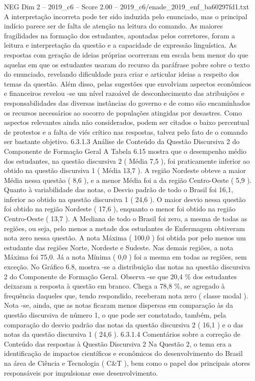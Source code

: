 \begin{textsample}{NEG Dim 2 – 2019\_c6 – Score 2.00 – 2019\_c6/enade\_2019\_enf\_ba60297fd1.txt}
A interpretação incorreta pode ter sido induzida pelo enunciado, mas o principal indício parece ser de falta de atenção na leitura do comando.
As maiores fragilidades na formação dos estudantes, apontadas pelos corretores, foram a leitura e interpretação da questão e a capacidade de expressão linguística.
As respostas com geração de ideias próprias ocorreram em escala bem menor do que aquelas em que os estudantes usaram do recurso da paráfrase pobre sobre o texto do enunciado, revelando dificuldade para criar e articular ideias a respeito dos temas da questão.
Além disso, pelas sugestões que envolviam aspectos econômicos e financeiros revelou -se um nível razoável de desconhecimento das atribuições e responsabilidades das diversas instâncias do governo e de como são encaminhados os recursos necessários ao socorro de populações atingidas por desastres.
Como aspectos relevantes ainda não considerados, podem ser citados o baixo percentual de protestos e a falta de viés crítico nas respostas, talvez pelo fato de o comando ser bastante objetivo. 6.3.1.3 Análise de Conteúdo da Questão Discursiva 2 do Componente de Formação Geral A Tabela 6.15 mostra que o desempenho médio dos estudantes, na questão discursiva 2 ( Média 7,5 ), foi praticamente inferior ao obtido na questão discursiva 1 ( Média 13,7 ).
A região Nordeste obteve a maior Média nessa questão ( 8,6 ), e a menor Média foi a da região Centro-Oeste ( 5,9 ).
Quanto à variabilidade das notas, o Desvio padrão de todo o Brasil foi 16,1, inferior ao obtido na questão discursiva 1 ( 24,6 ).
O maior desvio nessa questão foi obtido na região Nordeste ( 17,6 ), enquanto o menor foi obtido na região Centro-Oeste ( 13,7 ).
A Mediana de todo o Brasil foi zero, a mesma de todas as regiões, ou seja, pelo menos a metade dos estudantes de Enfermagem obtiveram nota zero nessa questão.
A nota Máxima ( 100,0 ) foi obtida por pelo menos um estudante das regiões Norte, Nordeste e Sudeste.
Nas demais regiões, a nota Máxima foi 75,0.
Já a nota Mínima ( 0,0 ) foi a mesma em todas as regiões, sem exceção.
No Gráfico 6.8, mostra -se a distribuição das notas na questão discursiva 2 do Componente de Formação Geral.
Observa -se que 20,4 \% dos estudantes deixaram a resposta à questão em branco.
Chega a 78,8 \%, se agregado à frequência daqueles que, tendo respondido, receberam nota zero ( classe modal ).
Nota -se, ainda, que as notas ficaram menos dispersas em comparação às da questão discursiva de número 1, o que pode ser constatado, também, pela comparação do desvio padrão das notas da questão discursiva 2 ( 16,1 ) e o das notas da questão discursiva 1 ( 24,6 ). 6.3.1.4 Comentários sobre a correção de Conteúdo das respostas à Questão Discursiva 2 Na Questão 2, o tema era a identificação de impactos científicos e econômicos do desenvolvimento do Brasil na área de Ciência e Tecnologia ( C\&T ), bem como o papel dos principais atores responsáveis por impulsionar esse desenvolvimento.

\end{textsample}
